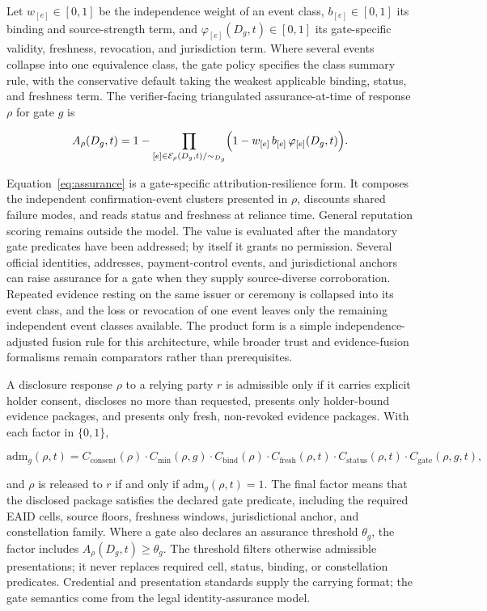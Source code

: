 \documentclass[oneside,10pt]{swissi}
\begin{document}
Let $w_{[e]} \in [0,1]$ be the independence weight of an event class, $b_{[e]} \in [0,1]$ its binding and source-strength term, and $\varphi_{[e]}(D_g,t) \in [0,1]$ its gate-specific validity, freshness, revocation, and jurisdiction term. Where several events collapse into one equivalence class, the gate policy specifies the class summary rule, with the conservative default taking the weakest applicable binding, status, and freshness term. The verifier-facing triangulated assurance-at-time of response $\rho$ for gate $g$ is

\begin{equation}
\label{eq:assurance}
A_\rho(D_g,t) = 1 - \prod_{[e] \in \mathcal{E}_\rho(D_g,t)/{\sim_{D_g}}} \Bigl(1 - w_{[e]}\, b_{[e]}\, \varphi_{[e]}(D_g,t)\Bigr).
\end{equation}

Equation~\eqref{eq:assurance} is a gate-specific attribution-resilience form. It composes the independent confirmation-event clusters presented in $\rho$, discounts shared failure modes, and reads status and freshness at reliance time. General reputation scoring remains outside the model. The value is evaluated after the mandatory gate predicates have been addressed; by itself it grants no permission. Several official identities, addresses, payment-control events, and jurisdictional anchors can raise assurance for a gate when they supply source-diverse corroboration. Repeated evidence resting on the same issuer or ceremony is collapsed into its event class, and the loss or revocation of one event leaves only the remaining independent event classes available. The product form is a simple independence-adjusted fusion rule for this architecture, while broader trust and evidence-fusion formalisms remain comparators rather than prerequisites.\cite{josang2016subjective}

A disclosure response $\rho$ to a relying party $r$ is admissible only if it carries explicit holder consent, discloses no more than requested, presents only holder-bound evidence packages, and presents only fresh, non-revoked evidence packages. With each factor in $\{0,1\}$,

\begin{equation}
\label{eq:disclosure}
\mathrm{adm}_g(\rho,t) = C_{\text{consent}}(\rho)\cdot C_{\text{min}}(\rho,g)\cdot C_{\text{bind}}(\rho)\cdot C_{\text{fresh}}(\rho,t)\cdot C_{\text{status}}(\rho,t)\cdot C_{\text{gate}}(\rho,g,t),
\end{equation}

and $\rho$ is released to $r$ if and only if $\mathrm{adm}_g(\rho,t) = 1$. The final factor means that the disclosed package satisfies the declared gate predicate, including the required EAID cells, source floors, freshness windows, jurisdictional anchor, and constellation family. Where a gate also declares an assurance threshold $\theta_g$, the factor includes $A_\rho(D_g,t) \ge \theta_g$. The threshold filters otherwise admissible presentations; it never replaces required cell, status, binding, or constellation predicates. Credential and presentation standards supply the carrying format; the gate semantics come from the legal identity-assurance model.\cite{w3cvc,sdjwt,oid4vp,kurz2026actorassurance}
\end{document}
